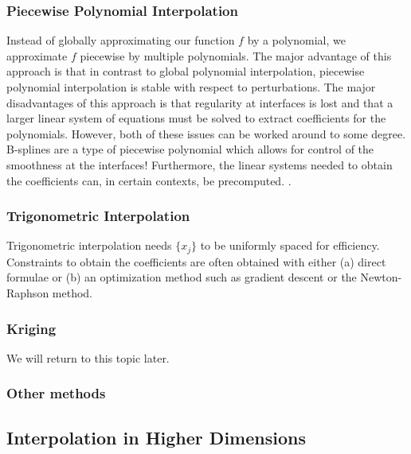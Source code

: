 \subsubsection{Piecewise Polynomial Interpolation}
Instead of globally approximating our function $f$ by a polynomial, we approximate $f$ piecewise by multiple polynomials. The major advantage of this approach is that in contrast to global polynomial interpolation, piecewise polynomial interpolation is stable with respect to perturbations. The major disadvantages of this approach is that regularity at interfaces is lost and that a larger linear system of equations must be solved to extract coefficients for the polynomials. However, both of these issues can be worked around to some degree. B-splines are a type of piecewise polynomial which allows for control of the smoothness at the interfaces! Furthermore, the linear systems needed to obtain the coefficients can, in certain contexts, be precomputed. . 

\subsubsection{Trigonometric Interpolation}
Trigonometric interpolation needs $\{x_j\}$ to be uniformly spaced for efficiency. Constraints to obtain the coefficients are often obtained with either (a) direct formulae or (b) an optimization method such as gradient descent or the Newton-Raphson method.

\subsubsection{Kriging}
We will return to this topic later.

\subsubsection{Other methods}

\subsection{Interpolation in Higher Dimensions}

